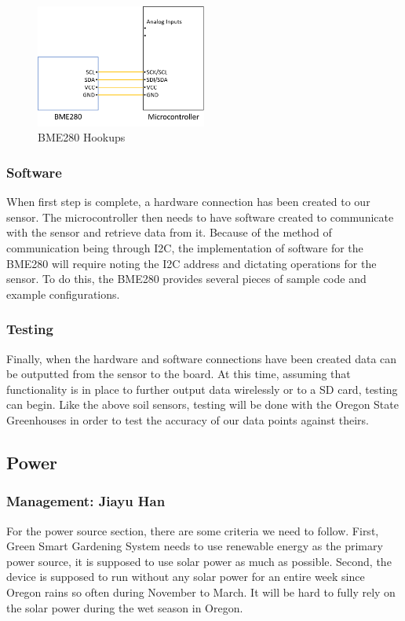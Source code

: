 \documentclass[IEEEtran,letterpaper,10pt,titlepage,fleqn,draftclsnofoot,onecolumn]{article}
\begin{document}
\begin{figure}[H]
  \caption{BME280 Hookups}
  \centering
    \includegraphics[width=0.5\textwidth]
  {bme280_hookup}
\end{figure}

\subsubsection{Software}

When first step is complete, a hardware connection has been created to our sensor. The microcontroller then needs to have software created to communicate with the sensor and retrieve data from it. Because of the method of communication being through I2C, the implementation of software for the BME280 will require noting the I2C address and dictating operations for the sensor. To do this, the BME280 provides several pieces of sample code and example configurations.

\subsubsection{Testing}

Finally, when the hardware and software connections have been created data can be outputted from the sensor to the board. At this time, assuming that functionality is in place to further output data wirelessly or to a SD card, testing can begin. Like the above soil sensors, testing will be done with the Oregon State Greenhouses in order to test the accuracy of our data points against theirs. 

\subsection{Power}
\subsubsection{Management: Jiayu Han}

For the power source section, there are some criteria we need to follow. First, Green Smart Gardening System needs to use renewable energy as the primary power source, it is supposed to use solar power as much as possible. Second, the device is supposed to run without any solar power for an entire week since Oregon rains so often during November to March. It will be hard to fully rely on the solar power during the wet season in Oregon. 
\end{document}
